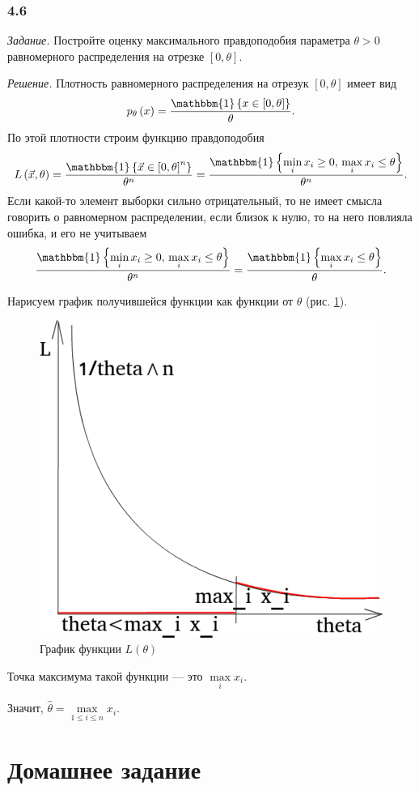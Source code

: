 \subsubsection*{4.6}

\textit{Задание.}
Постройте оценку максимального правдоподобия параметра $ \theta > 0$
равномерного распределения на отрезке $ \left[ 0, \theta \right] $.

\textit{Решение.}
Плотность равномерного распределения на отрезук $ \left[ 0, \theta \right] $ имеет вид
$$p_{ \theta } \left( x \right) =
  \frac{ \mathbbm{1} \left\{ x \in \left[ 0, \theta \right] \right\} }{ \theta }.$$
По этой плотности строим функцию правдоподобия
$$L \left( \vec{x}, \theta \right) =
  \frac{ \mathbbm{1} \left\{ \vec{x} \in \left[ 0, \theta \right]^n \right\} }{ \theta^n} =
  \frac{ \mathbbm{1} \left\{ \min \limits_i x_i \geq 0, \, \max \limits_i x_i \leq \theta \right\} }{ \theta^n}.$$
Если какой-то элемент выборки сильно отрицательный,
то не имеет смысла говорить о равномерном распределении, если близок к нулю,
то на него повлияла ошибка, и его не учитываем
$$ \frac{ \mathbbm{1} \left\{ \min \limits_i x_i \geq 0, \, \max \limits_i x_i \leq \theta \right\} }{ \theta^n} =
  \frac{ \mathbbm{1} \left\{ \max \limits_i x_i \leq \theta \right\} }{ \theta }.$$

Нарисуем график получившейся функции как функции от $ \theta $ (рис. \ref{fig:46}).

\begin{figure}[h!]
  \centering
  \includegraphics[width=.4\textwidth]{./pictures/4_6.png}
  \caption{График функции $L \left( \theta \right) $}
  \label{fig:46}
\end{figure}

Точка максимума такой функции --- это $ \max \limits_i x_i$.

Значит, $ \hat{ \theta } = \max \limits_{1 \leq i \leq n} x_i$.

\section*{Домашнее задание}
